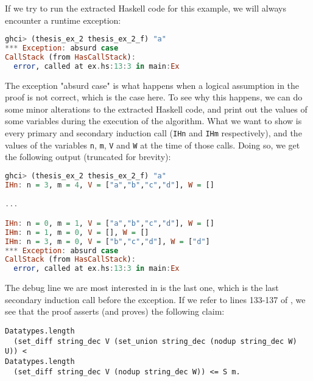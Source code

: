 If we try to run the extracted Haskell code for this example,
we will always encounter a runtime exception:

\begin{minipage}{\linewidth}
\begin{lstlisting}[language=Haskell, label={lst:thm_32_haskell_output_extended}, caption={\lstinline{thm_32} example extended output}]
ghci> (thesis_ex_2 thesis_ex_2_f) "a"
*** Exception: absurd case
CallStack (from HasCallStack):
  error, called at ex.hs:13:3 in main:Ex
\end{lstlisting}
\end{minipage}

The exception "absurd case" is what happens when a logical assumption in the proof
is not correct, which is the case here.
To see why this happens, we can do some minor alterations to the extracted Haskell code,
and print out the values of some variables during the execution of the algorithm.
What we want to show is every primary and secondary induction call (\lstinline{IHn} and \lstinline{IHm} respectively),
and the values of the variables \lstinline{n}, \lstinline{m}, \lstinline{V} and \lstinline{W} at the time of those calls.
Doing so, we get the following output (truncated for brevity):

\begin{lstlisting}[language=Haskell, label={lst:thm_32_haskell_output_extended_debug}, caption={\lstinline{thm_32} example extended output with debug}]
ghci> (thesis_ex_2 thesis_ex_2_f) "a"
IHn: n = 3, m = 4, V = ["a","b","c","d"], W = []

...

IHn: n = 0, m = 1, V = ["a","b","c","d"], W = []
IHm: n = 1, m = 0, V = [], W = []
IHm: n = 3, m = 0, V = ["b","c","d"], W = ["d"]
*** Exception: absurd case
CallStack (from HasCallStack):
  error, called at ex.hs:13:3 in main:Ex
\end{lstlisting}

The debug line we are most interested in is the last one,
which is the last secondary induction call before the exception.
If we refer to lines 133-137 of ,
we see that the proof asserts (and proves) the following claim:

\begin{minipage}{\linewidth}
\begin{lstlisting}[language=Coq, label={lst:thm_32_false_claim}, caption={False claim in \lstinline{thm_32} proof}]
Datatypes.length
  (set_diff string_dec V (set_union string_dec (nodup string_dec W) U)) <
Datatypes.length
  (set_diff string_dec V (nodup string_dec W)) <= S m.
\end{lstlisting}
\end{minipage}

